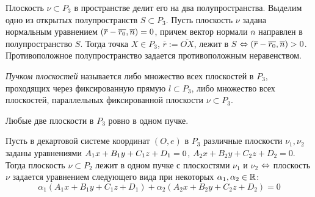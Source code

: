 \begin{note}
	Плоскость $\nu \subset P_3$ в пространстве делит его на два полупространства. Выделим одно из открытых полупространств $S \subset P_3$. Пусть плоскость $\nu$ задана нормальным уравнением $(\overline{r} \hm{-} \overline{r_0}, \overline{n}) = 0$, причем вектор нормали $\overline{n}$ направлен в полупространство $S$. Тогда точка $X \in P_3$, $\overline{r} := \overline{OX}$, лежит в $S$ $\Leftrightarrow (\overline{r} \hm{-} \overline{r_0}, \overline{n}) > 0$. Противоположное полупространство задается противоположным неравенством.
\end{note}

\begin{definition}
	\textit{Пучком плоскостей} называется либо множество всех плоскостей в $P_3$, проходящих через фиксированную прямую $l \subset P_3$, либо множество всех плоскостей, параллельных фиксированной плоскости $\nu \subset P_3$.
\end{definition}

\begin{note}
	Любые две плоскости в $P_3$ ровно в одном пучке.
\end{note}

\begin{theorem}
	Пусть в декартовой системе координат $(O, e)$ в $P_3$ различные плоскости $\nu_1, \nu_2$ заданы уравнениями $A_1x\hm{+}B_1y+C_1z+D_1=0$, $A_2x+B_2y+C_2z+D_2=0$. Тогда плоскость $\nu \subset P_2$ лежит в одном пучке с плоскостями $\nu_1$ и $\nu_2$ $\Leftrightarrow$ плоскость $\nu$ задается уравнением следующего вида при некоторых $\alpha_1, \alpha_2 \in \mathbb{R}$:
	\[\alpha_1(A_1x+B_1y+C_1z+D_1) + \alpha_2(A_2x+B_2y+C_2z+D_2) = 0\]
\end{theorem}

